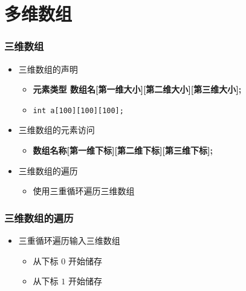 \section{多维数组}

\begin{frame}[fragile]
    \frametitle{三维数组}

    \begin{itemize}
        \item<1-> 三维数组的声明
        \begin{itemize}
            \item<1-> \textbf{元素类型 \enspace 数组名[第一维大小][第二维大小][第三维大小];}
            \item<1-> \lstinline|int a[100][100][100];|
        \end{itemize}
        \item<2-> 三维数组的元素访问
        \begin{itemize}
            \item<2-> \textbf{数组名称[第一维下标][第二维下标][第三维下标];}
        \end{itemize}
        \item<3-> 三维数组的遍历
        \begin{itemize}
            \item<3-> 使用三重循环遍历三维数组
        \end{itemize}
    \end{itemize}
\end{frame}

\begin{frame}[fragile]
    \frametitle{三维数组的遍历}

        \begin{itemize}
            \item 三重循环遍历输入三维数组

                \begin{itemize}
                    \item<2-> 从下标 $0$ 开始储存
                    \item<4-> 从下标 $1$ 开始储存
                \end{itemize}
        \end{itemize}
\end{frame}

